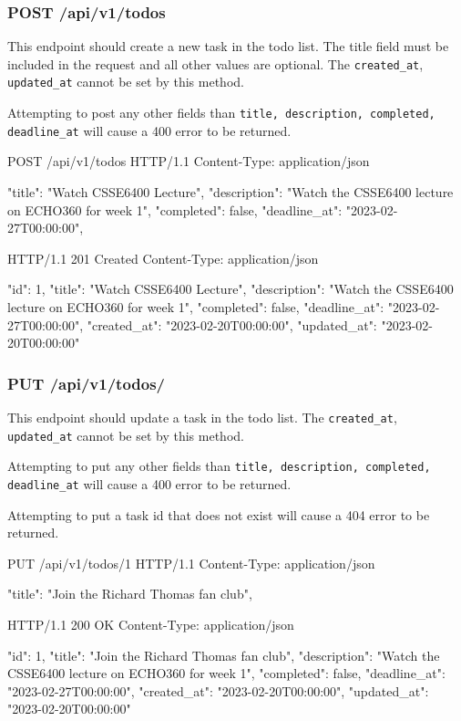 \documentclass{csse4400}
\begin{document}
\subsubsection{POST /api/v1/todos}
This endpoint should create a new task in the todo list. The title field must be included in the request and all other values are optional. The \texttt{created\_at}, \texttt{updated\_at} cannot be set by this method.

Attempting to post any other fields than \texttt{title, description, completed, deadline\_at} will cause a 400 error to be returned.


\begin{code}[language=json,numbers=none]{}
POST /api/v1/todos HTTP/1.1
Content-Type: application/json

{
    "title": "Watch CSSE6400 Lecture",
    "description": "Watch the CSSE6400 lecture on ECHO360 for week 1",
    "completed": false,
    "deadline_at": "2023-02-27T00:00:00",
}
\end{code}
\begin{code}[language=json,numbers=none]{}
HTTP/1.1 201 Created
Content-Type: application/json

{
    "id": 1,
    "title": "Watch CSSE6400 Lecture",
    "description": "Watch the CSSE6400 lecture on ECHO360 for week 1",
    "completed": false,
    "deadline_at": "2023-02-27T00:00:00",
    "created_at": "2023-02-20T00:00:00",
    "updated_at": "2023-02-20T00:00:00"
}
\end{code}

\subsubsection{PUT /api/v1/todos/}
This endpoint should update a task in the todo list. The \texttt{created\_at}, \texttt{updated\_at} cannot be set by this method.

Attempting to put any other fields than \texttt{title, description, completed, deadline\_at} will cause a 400 error to be returned.

Attempting to put a task id that does not exist will cause a 404 error to be returned.

\begin{code}[language=json,numbers=none]{}
PUT /api/v1/todos/1 HTTP/1.1
Content-Type: application/json

{
    "title": "Join the Richard Thomas fan club",
}
\end{code}

\begin{code}[language=json,numbers=none]{}
HTTP/1.1 200 OK
Content-Type: application/json

{
    "id": 1,
    "title": "Join the Richard Thomas fan club",
    "description": "Watch the CSSE6400 lecture on ECHO360 for week 1",
    "completed": false,
    "deadline_at": "2023-02-27T00:00:00",
    "created_at": "2023-02-20T00:00:00",
    "updated_at": "2023-02-20T00:00:00"
}
\end{code}
\end{document}
